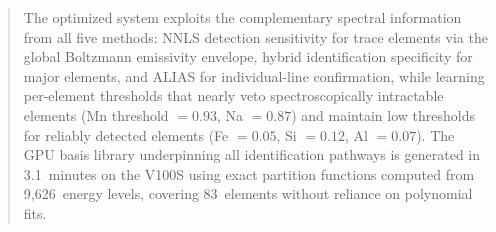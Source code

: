 \begin{abstract}
The optimized system exploits the complementary spectral information from all five methods: NNLS detection sensitivity for trace elements via the global Boltzmann emissivity envelope, hybrid identification specificity for major elements, and ALIAS for individual-line confirmation, while learning per-element thresholds that nearly veto spectroscopically intractable elements (Mn threshold $= 0.93$, Na $= 0.87$) and maintain low thresholds for reliably detected elements (Fe $= 0.05$, Si $= 0.12$, Al $= 0.07$).
The GPU basis library underpinning all identification pathways is generated in 3.1~minutes on the V100S using exact partition functions computed from 9{,}626~energy levels, covering 83~elements without reliance on polynomial fits.
\end{abstract}
